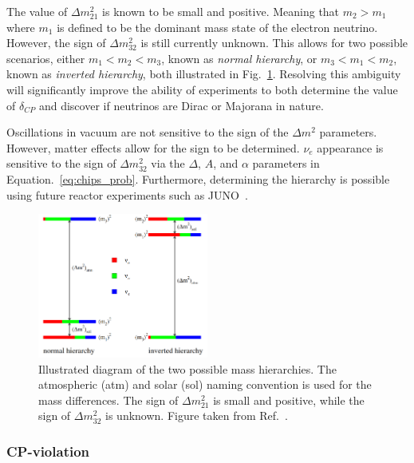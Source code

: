 The value of $\Delta m_{21}^2$ is known to be small and positive. Meaning that $m_{2}>m_{1}$ where
$m_{1}$ is defined to be the dominant mass state of the electron neutrino. However, the sign of
$\Delta m_{32}^2$ is still currently unknown. This allows for two possible scenarios, either
$m_1<m_2<m_3$, known as \emph{normal hierarchy}, or $m_3<m_1<m_2$, known as \emph{inverted
    hierarchy}, both illustrated in Fig.~\ref{fig:hierarchy}. Resolving this ambiguity will
significantly improve the ability of experiments to both determine the value of $\delta_{CP}$ and
discover if neutrinos are Dirac or Majorana in nature.

Oscillations in vacuum are not sensitive to the sign of the $\Delta m^{2}$ parameters. However,
matter effects allow for the sign to be determined. $\nu_{e}$ appearance is sensitive to the sign
of $\Delta m_{32}^2$ via the $\Delta$, $A$, and $\alpha$ parameters in
Equation.~\ref{eq:chips_prob}. Furthermore, determining the hierarchy is possible using future
reactor experiments such as JUNO~\cite{an2016}.

\begin{figure} %
    \includegraphics[origin=c,width=0.5\textwidth]{diagrams/3-theory/hierarchy.png}
    \caption[Illustration of the two possible mass hierarchies]
    {Illustrated diagram of the two possible mass hierarchies. The atmospheric (atm) and solar
        (sol) naming convention is used for the mass differences. The sign of $\Delta m_{21}^{2}$
        is small and positive, while the sign of $\Delta m_{32}^{2}$ is unknown. Figure taken from
        Ref.~\cite{gouvea2013}.}
    \label{fig:hierarchy}
\end{figure}

\subsubsection*{CP-violation} %

